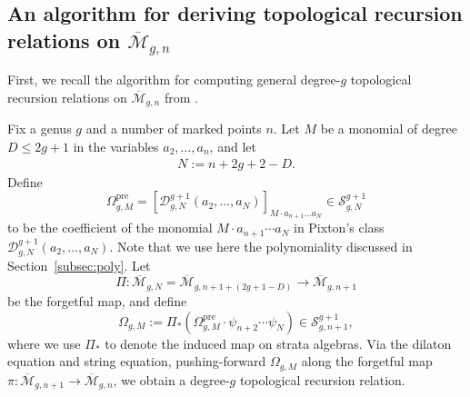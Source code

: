 \documentclass[12pt,reqno]{amsart}
\theoremstyle{plain}
\theoremstyle{definition}
\theoremstyle{remark}
\begin{document}










\subsection{An algorithm for deriving topological recursion relations on $\overline{\mathcal{M}}_{g,n}$ }\label{subsec:algorithm-trr}
First, we recall the algorithm for computing general degree-$g$ topological recursion relations on $\overline{\mathcal{M}}_{g,n}$ from \cite{clader2023topological}.

Fix a genus $g$ and a number of marked points $n$.  Let $M$ be a monomial of degree $D\leq 2g+1$ in the variables $a_2, \ldots, a_n$, and let
\begin{align*}
N:= n+2g+2-D.
\end{align*}
Define
\[\Omega_{g,M}^{\text{pre}}=\left[\mathcal{D}^{g+1}_{g,N}(a_2, \ldots, a_N)\right]_{M\cdot a_{n+1}\dots a_{N}}
 \in \mathcal{S}^{g+1}_{g,N}\]
to be the coefficient of the monomial $M \cdot a_{n+1} \cdots a_N$ in Pixton's class $\mathcal{D}^{g+1}_{g,N}(a_2, \ldots, a_N)$.  Note that we use here the polynomiality discussed in Section~\ref{subsec:poly}.
Let
\[\Pi\colon \overline{\mathcal{M}}_{g,N}=\overline{\mathcal{M}}_{g,n+1+(2g+1-D)} \rightarrow \overline{\mathcal{M}}_{g,n+1}\]
be the forgetful map, and define
\[\Omega_{g,M}:= \Pi_*(\Omega_{g,M}^{\text{pre}} \cdot \psi_{n+2} \cdots \psi_{N}) \in \mathcal{S}_{g,n+1}^{g+1},\]
where we use $\Pi_*$ to denote the induced map on strata algebras.
Via the dilaton equation and string equation, pushing-forward $\Omega_{g,M}$
along the forgetful map
$\pi\colon \overline{\mathcal{M}}_{g,n+1} \rightarrow
\overline{\mathcal{M}}_{g,n}$, we obtain a degree-$g$ topological
recursion relation.
\end{document}
